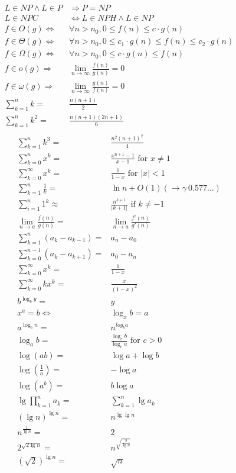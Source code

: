 \documentclass[10pt, a4paper,landscape]{article}
\begin{document}
\begin{multicols*}{4}
\begin{align*}
    L \in NP \wedge L \in P &\Rightarrow P = NP\\
L \in NPC &\Leftrightarrow L \in NPH \wedge L \in NP\\
    f \in O(g) \Leftrightarrow& \forall n > n_0, 0 \leq f(n) \leq c \cdot g(n) \\
    f \in \Theta(g) \Leftrightarrow& \forall n > n_0, 0 \leq c_1 \cdot g(n) \leq f(n) \leq c_2 \cdot g(n) \\
    f \in \Omega(g) \Leftrightarrow& \forall n > n_0, 0 \leq c \cdot g(n) \leq f(n) \\
    f \in o(g) \Rightarrow& \lim_{n \rightarrow \infty} \frac {f(n)} {g(n)} = 0 \\
    f \in \omega(g) \Rightarrow& \lim_{n \rightarrow \infty} \frac {g(n)} {f(n)} = 0 \\
    \sum_{k=1}^{n} k =& \frac{n(n + 1)}{2}\\
    \sum_{k=1}^{n} k^2 =& \frac{n(n + 1)(2n + 1)}{6}\\
\end{align*}
\begin{align*}
    \sum_{k=1}^{n} k^3 =& \frac{n^2 (n + 1)^2}{4}\\
    \sum_{k=0}^{n} x^k =& \frac{x^{n+1} - 1}{x - 1} \text{ for } x \neq 1\\
    \sum_{k=0}^{\infty} x^k =& \frac{1}{1 - x} \text{ for } |x| < 1\\
    \sum_{k=1}^{n} \frac{1}{k} =& \ln n + O(1) (\rightarrow \gamma ~ 0.577 \ldots)\\
    \sum_{i=1}^{n} 1^k \approx& \frac{n^{k +1}}{|k + 1|} \text{ if } k \neq -1\\
    \lim_{n \rightarrow a} \frac{f(n)}{g(n)} =& \lim_{n \rightarrow a} \frac{f'(n)}{g'(n)}\\
    \sum_{k=1}^{n} (a_k - a_{k - 1}) =& a_n - a_0\\
    \sum_{k=0}^{n-1} (a_k- a_{k + 1}) =& a_0 - a_n\\
    \sum_{k=0}^{\infty} x^k =& \frac{1}{1 - x}\\
    \sum_{k=0}^{\infty} kx^k =& \frac{x}{(1 - x)^2}\\
    b^{\log_b y} =& y\\
    x^a = b \Leftrightarrow & \log_x b = a\\
    a^{\log_b n} =& n^{log_b a}\\
    \log_a b =& \frac{\log_c b}{\log_c a} \text{ for } c > 0\\
    \log(ab) =& \log a + \log b\\
    \log(\frac{1}{a}) =& -\log a\\
    \log(a^b) =& b \log a\\
    \lg \prod_{k = 1}^{n} a_k =& \sum_{k = 1}^{n} \lg a_k\\
    (\lg n)^{\lg n} =& n^{\lg \lg n}\\
    n^{\frac{1}{\lg n}} =& 2\\
    2^{\sqrt{2 \lg n}} =& n^{\sqrt{\frac{2}{\lg n}}}\\
    (\sqrt{2})^{\lg n} =& \sqrt{n}\\
\end{align*}


\end{multicols*}
\end{document}
